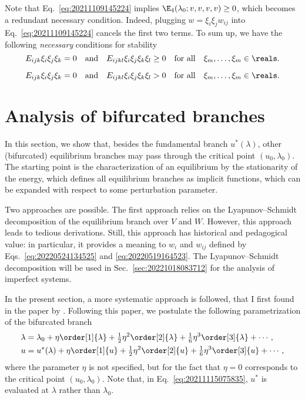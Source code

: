Note that Eq.~\eqref{eq:20211109145224} implies $\E_4(\lambda_0; v, v, v, v) \geq 0$, which becomes a redundant
necessary condition. Indeed, plugging $w= \xi_i \xi_j w_{ij}$ into Eq.~\eqref{eq:20211109145224} cancels the first two
terms. To sum up, we have the following \emph{necessary} conditions for stability
\begin{equation}
  E_{ijk} \xi_i \xi_j \xi_k = 0 \quad \text{and} \quad E_{ijkl} \xi_i \xi_j \xi_k \xi_l \geq 0 \quad \text{for all} \quad \xi_m, \ldots, \xi_m \in \reals.
\end{equation}

\begin{equation}
  E_{ijk} \xi_i \xi_j \xi_k = 0 \quad \text{and} \quad E_{ijkl} \xi_i \xi_j \xi_k \xi_l > 0 \quad \text{for all} \quad \xi_m, \ldots, \xi_m \in \reals.
\end{equation}

\section{Analysis of bifurcated branches}
\label{sec:20220617075558}

In this section, we show that, besides the fundamental branch $u^\ast(\lambda)$, other (bifurcated) equilibrium branches
may pass through the critical point $(u_0, \lambda_0)$. The starting point is the characterization of an equilibrium by
the stationarity of the energy, which defines all equilibrium branches as implicit functions, which can be expanded with
respect to some perturbation parameter.

Two approaches are possible. The first approach relies on the Lyapunov--Schmidt decomposition of the equilibrium branch
over $V$ and $W$. However, this approach leads to tedious derivations. Still, this approach has historical and
pedagogical value: in particular, it provides a meaning to $w_i$ and $w_{ij}$ defined by Eqs.~\eqref{eq:20220524134525}
and \eqref{eq:20220519164523}. The Lyapunov--Schmidt decomposition will be used in Sec.~\ref{sec:20221018083712} for the
analysis of imperfect systems.

In the present section, a more systematic approach is followed, that I first found in the paper by \textcite[][Appendix
A]{chak2018}. Following this paper, we postulate the following parametrization of the bifurcated branch
\begin{align}
  \label{eq:20211115075817}
  \lambda &=  \lambda_0 + \eta \order[1]{\lambda} + \tfrac{1}{2} \eta^2 \order[2]{\lambda} + \tfrac{1}{6} \eta^3 \order[3]{\lambda} + \cdots,\\
  \label{eq:20211115075835}
  u &= u^{\ast}(\lambda) + \eta \order[1]{u} + \tfrac{1}{2} \eta^2 \order[2]{u} + \tfrac{1}{6} \eta^3 \order[3]{u} + \cdots,
\end{align}
where the parameter $\eta$ is not specified, but for the fact that $\eta = 0$ corresponds to the critical point
$(u_0, \lambda_0)$. Note that, in Eq.~\eqref{eq:20211115075835}, $u^\ast$ is evaluated at $\lambda$ rather than
$\lambda_0$.

